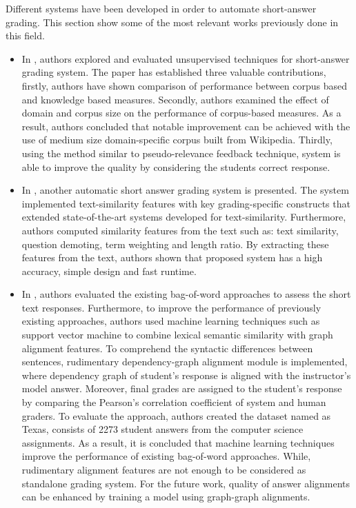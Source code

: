 \documentclass{article}
\begin{document}
\newpage
\begin{flushleft}
Different systems have been developed in order to automate short-answer grading. This section show some of the most relevant works previously done in this field.
\end{flushleft}


\begin{itemize}
\item In \cite{text-similarity}, authors  explored and evaluated unsupervised techniques for short-answer grading system. The paper has established three valuable contributions, firstly, authors have shown comparison of performance between corpus based and knowledge based measures.
Secondly, authors examined the effect of domain and corpus size on the performance of corpus-based measures. As a result, authors concluded that notable improvement can be achieved with the use of medium size domain-specific corpus built from Wikipedia. 
Thirdly, using the method similar to pseudo-relevance feedback technique, system is able to improve the quality by considering the students correct response.  
\end{itemize}

\begin{itemize}
\item In \cite{MdArfat}, another automatic short answer grading system is presented. The system implemented text-similarity features with key grading-specific constructs that extended state-of-the-art systems developed for text-similarity. Furthermore, authors computed similarity features from the text such as: text similarity, question demoting, term weighting and length ratio. By extracting these features from the text, authors shown that proposed system has a high accuracy, simple design and fast runtime.  
\end{itemize}

\begin{itemize}
\item In \cite{texas}, authors evaluated the existing bag-of-word approaches to assess the short text responses. Furthermore, to improve the performance of previously existing approaches, authors used machine learning techniques such as support vector machine to combine lexical semantic similarity with graph alignment features. To comprehend the syntactic differences between sentences, rudimentary dependency-graph alignment module is implemented, where dependency graph of student's response is aligned with the instructor's model answer. Moreover, final grades are assigned to the student's response by comparing the Pearson's correlation coefficient of system and human graders. To evaluate the approach, authors created the dataset named as Texas, consists of 2273 student answers from the computer science assignments. As a result, it is concluded that machine learning techniques improve the performance of existing bag-of-word approaches. While, rudimentary alignment features are not enough to be considered as  standalone grading system. For the future work, quality of answer alignments can be enhanced by training a model using graph-graph alignments.  
\end{itemize}
\newpage
\end{document}
